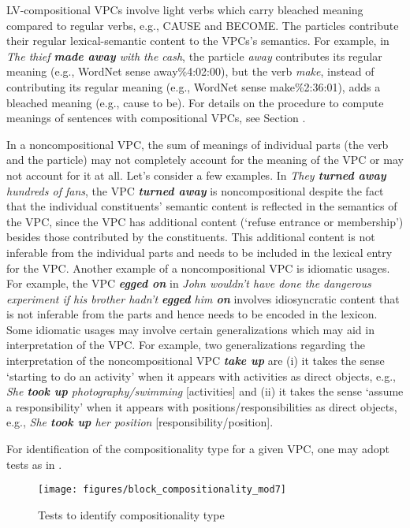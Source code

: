 \documentclass[output=paper
,modfonts
,nonflat]{langsci/langscibook}
\begin{document}
LV-compositional VPCs involve light verbs which carry bleached meaning compared to regular verbs, e.g., CAUSE and BECOME. The particles contribute their regular lexical-semantic content to the VPCs's semantics.  For example, in \textit{The thief \textbf{made away} with the cash}, the particle \textit{away} contributes its regular meaning (e.g., WordNet sense away\%4:02:00), but the verb \textit{make}, instead of contributing its regular meaning (e.g., WordNet sense make\%2:36:01), adds a bleached meaning (e.g., cause to be). For details on the procedure to compute meanings of sentences with compositional VPCs, see Section .

In a noncompositional VPC, the sum of meanings of individual parts (the verb and the particle) may not completely account for the meaning of the VPC or may not account for it at all. Let's consider a few examples. In \textit{They \textbf{turned away} hundreds of fans}, the VPC \textit{\textbf{turned away}} is noncompositional  despite the fact that the individual constituents' semantic content is reflected in the semantics of the VPC, since the VPC has additional content (`refuse entrance or membership') besides those contributed by the constituents. This additional content is not inferable from the individual parts and needs to be included in the lexical entry for the VPC. Another example of a noncompositional VPC is idiomatic usages. For example, the VPC \textit{\textbf{egged on}} in \textit{John wouldn't have done the dangerous experiment if his brother hadn't \textbf{egged} him \textbf{on}} involves idiosyncratic content that is not inferable from the parts and hence needs to be encoded in the lexicon. Some idiomatic usages may involve certain generalizations which may aid in interpretation of the VPC. For example, two generalizations regarding the interpretation of the noncompositional VPC \textit{\textbf{take up}} are (i) it takes the sense `starting to do an activity' when it appears with activities as direct objects, e.g., \textit{She \textbf{took up} photography/swimming} [activities] and (ii) it takes the sense `assume a responsibility' when it appears with positions/responsibilities as direct objects, e.g., \textit{She \textbf{took up} her position} [responsibility/position]. 

For identification of the compositionality type for a given VPC, one may adopt tests as in .

\begin{figure}[t]
\texttt{[image: figures/block\_compositionality\_mod7]}
\vspace*{-2mm}
\caption{Tests to identify compositionality type}\label{fig:tests}
\end{figure}
\vspace*{-4mm}
\end{document}
